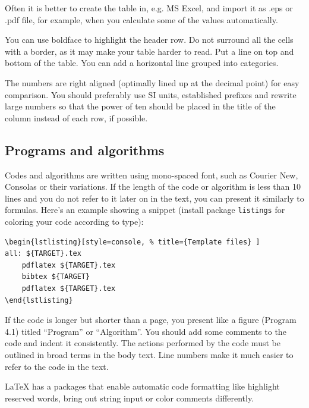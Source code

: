 Often it is better to create the table in, e.g. MS Excel, and import
it as .eps or .pdf file, for example, when you calculate some of the
values automatically.

You can use boldface to highlight the header row. Do not surround all 
the cells with a border, as it may make your table harder to read. 
Put a line on top and bottom of the table. You can add a horizontal line
grouped into categories.

The numbers are right aligned (optimally lined up at the decimal
point) for easy comparison. You should preferably use SI units,
established prefixes and rewrite large numbers so that the power of
ten should be placed in the title of the column instead of each row,
if possible. 


\subsection{Programs and algorithms}

Codes and algorithms are written using mono-spaced font, such as
Courier New, Consolas or their variations. If the length of the code
or algorithm is less than 10 lines and you do not refer to it later on
in the text, you can present it similarly to formulas.  Here's an
example showing a snippet (install package \verb!listings! for coloring your code according to type):

\begin{verbatim}
\begin{lstlisting}[style=console, % title={Template files} ] 
all: ${TARGET}.tex
	pdflatex ${TARGET}.tex
	bibtex ${TARGET}
	pdflatex ${TARGET}.tex
\end{lstlisting}  
\end{verbatim}


If the code is longer but shorter than a page, you present like a
figure (Program 4.1) titled ``Program'' or ``Algorithm''.
You should add some comments to the code and indent it
consistently. The actions performed by the code must be outlined in
broad terms in the body text. Line numbers make it much easier to
refer to the code in the text. 

LaTeX has a packages that enable automatic code formatting like
highlight reserved words, bring out string input or color comments differently.